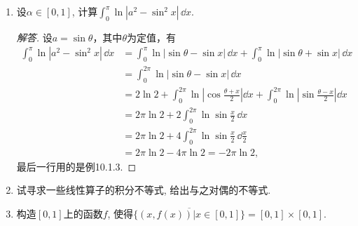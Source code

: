 \begin{b}
\begin{enumerate}
\begin{proof}[解答]
\[r_3:=\frac{\ii\alpha}{1+\alpha^4},\]
于是\(I'(\alpha)=\pi\ii\sum_{k=1}^{3}r_k=\frac{\left(\sqrt{2}\alpha^2-2\alpha+\sqrt{2}\right)\pi}{2(1+\alpha^4)}\), 注意到
\[\int\frac{\alpha}{1+\alpha^4}\,\dd\alpha=\frac{1}{2}\arctan\alpha^2+C,\]
以及\[\int\frac{\alpha^2+1}{1+\alpha^4}\,\dd\alpha
=\int\frac{1+1/\alpha^2}{\left(\alpha-1/\alpha\right)^2+2}\,\dd\alpha
=\frac{1}{\sqrt{2}}\arctan\left(\frac{\alpha-1/\alpha}{\sqrt{2}}\right)+C.\]
于是\[\begin{split}
&I\left(\sqrt{2-\sqrt{3}}\right)-I\left(\sqrt{2+\sqrt{3}}\right)
=\int_{\sqrt{2+\sqrt{3}}}^{\sqrt{2-\sqrt{3}}}I'(\alpha)\,\dd\alpha\\
&=\frac{\pi}{2}\left(\arctan\left(\frac{\alpha-1/\alpha}{\sqrt{2}}\right)-\arctan\alpha^2\right)\Big|_{\sqrt{2+\sqrt{3}}}^{\sqrt{2-\sqrt{3}}}\\
&=\frac{\pi}{2}\left(2\arctan\frac{\sqrt{2-\sqrt{3}}-\sqrt{2+\sqrt{3}}}{\sqrt{2}}-\left(\arctan\sqrt{2-\sqrt{3}}-\arctan\sqrt{2+\sqrt{3}}\right)\right)\\
&=\frac{\pi}{2}\left(-\frac{\pi}{2}+\frac{\pi}{3}\right)=-\frac{\pi}{12}.
\end{split}\]
所以\(\int_{0}^{+\infty}\frac{(1-x^2)\arctan x^2}{x^4+4x^2+1}\,\dd x
=-\frac{\sqrt{2}}{2}\cdot\frac{\pi^2}{12}=-\frac{\sqrt{2}\pi^2}{24}.\)
\end{proof}
\item 设\(\alpha\in[0,1]\), 计算\(\int_{0}^{\pi}\ln|a^2-\sin^2x|\,\dd x\).
\begin{proof}[解答]
设$a=\sin\theta$，其中$\theta$为定值，有
\begin{align*}
\int_{0}^{\pi}\ln|a^2-\sin^2x|\,\dd x&=\int_{0}^{\pi}\ln|\sin\theta-\sin x|\,\dd x+\int_{0}^{\pi}\ln|\sin\theta+\sin x|\,\dd x\\
&=\int_{0}^{2\pi}\ln|\sin\theta-\sin x|\,\dd x\\
&=2\ln 2+\int_{0}^{2\pi}\ln\left|\cos\frac{\theta+x}{2}\right|\dd x
+\int_{0}^{2\pi}\ln\left|\sin\frac{\theta-x}{2}\right|\dd x\\
&=2\pi\ln 2+2\int_{0}^{2\pi}\ln\sin\frac{x}{2}\,\dd x\\
&=2\pi\ln 2+4\int_{0}^{2\pi}\ln\sin\frac{x}{2}\,\dd \frac{x}{2}\\
&=2\pi\ln 2-4\pi\ln 2=-2\pi\ln 2,
\end{align*}
最后一行用的是例10.1.3.
\end{proof}
\item 试寻求一些线性算子的积分不等式, 给出与之对偶的不等式.
\item 构造\([0,1]\)上的函数\(f\), 使得\(\overline{\{\left(x,f(x)\right)|x\in[0,1]\}}=[0,1]\times [0,1]\).

\end{enumerate}
\end{b}

